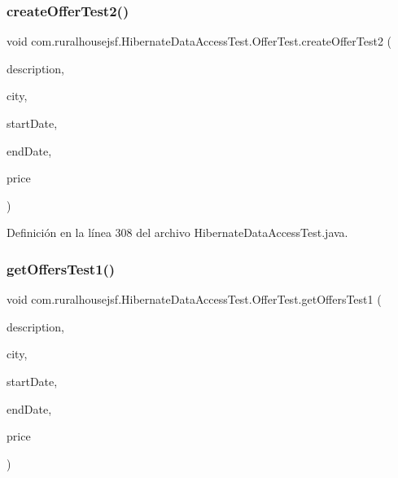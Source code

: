 \subsubsection{\texorpdfstring{createOfferTest2()}{createOfferTest2()}}
{\footnotesize\ttfamily void com.\+ruralhousejsf.\+Hibernate\+Data\+Access\+Test.\+Offer\+Test.\+create\+Offer\+Test2 (\begin{DoxyParamCaption}\item[{String}]{description,  }\item[{String}]{city,  }\item[{@Java\+Time\+Conversion\+Pattern(\char`\"{}dd/MM/yyyy\char`\"{}) Local\+Date}]{start\+Date,  }\item[{@Java\+Time\+Conversion\+Pattern(\char`\"{}dd/MM/yyyy\char`\"{}) Local\+Date}]{end\+Date,  }\item[{double}]{price }\end{DoxyParamCaption})\hspace{0.3cm}{\ttfamily [package]}}



Definición en la línea 308 del archivo Hibernate\+Data\+Access\+Test.\+java.

\mbox{\label{a00280_a5dc313dbb4fff4fd5e84b251acdddf05}} 
\subsubsection{\texorpdfstring{getOffersTest1()}{getOffersTest1()}}
{\footnotesize\ttfamily void com.\+ruralhousejsf.\+Hibernate\+Data\+Access\+Test.\+Offer\+Test.\+get\+Offers\+Test1 (\begin{DoxyParamCaption}\item[{String}]{description,  }\item[{String}]{city,  }\item[{@Java\+Time\+Conversion\+Pattern(\char`\"{}dd/MM/yyyy\char`\"{}) Local\+Date}]{start\+Date,  }\item[{@Java\+Time\+Conversion\+Pattern(\char`\"{}dd/MM/yyyy\char`\"{}) Local\+Date}]{end\+Date,  }\item[{double}]{price }\end{DoxyParamCaption})\hspace{0.3cm}{\ttfamily [package]}}



